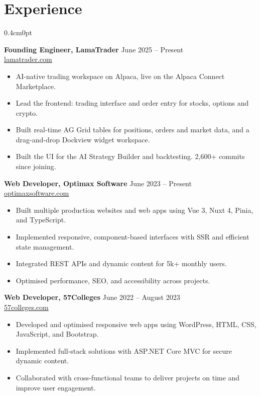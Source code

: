 \documentclass[a4paper,10pt]{article}
\newcommand{\Subtitle}[2][true]{%
    \vspace{0.3em}%
    {\fontsize{10.5}{12}\selectfont \textbf{#2}}%
    \ifstrequal{#1}{true}{\vspace{0.3em}}{}%
}
\begin{document}
\section*{Experience}
\begin{adjustwidth}{0.4cm}{0pt}

\Subtitle[false]{Founding Engineer, LamaTrader} \hfill June 2025 -- Present \\
\href{https://lamatrader.com}{lamatrader.com}
\begin{itemize}
    \item AI-native trading workspace on Alpaca, live on the Alpaca Connect Marketplace.
    \item Lead the frontend: trading interface and order entry for stocks, options and crypto.
    \item Built real-time AG Grid tables for positions, orders and market data, and a drag-and-drop Dockview widget workspace.
    \item Built the UI for the AI Strategy Builder and backtesting. 2,600+ commits since joining.
\end{itemize}

\Subtitle[false]{Web Developer, Optimax Software} \hfill June 2023 -- Present \\
\href{https://optimaxsoftware.com/}{optimaxsoftware.com}
\begin{itemize}
    \item Built multiple production websites and web apps using Vue 3, Nuxt 4, Pinia, and TypeScript.
    \item Implemented responsive, component-based interfaces with SSR and efficient state management.
    \item Integrated REST APIs and dynamic content for 5k+ monthly users.
    \item Optimised performance, SEO, and accessibility across projects.
\end{itemize}

\Subtitle[false]{Web Developer, 57Colleges} \hfill June 2022 -- August 2023 \\
\href{https://57colleges.com}{57colleges.com}
\begin{itemize}
    \item Developed and optimised responsive web apps using WordPress, HTML, CSS, JavaScript, and Bootstrap.
    \item Implemented full-stack solutions with ASP.NET Core MVC for secure dynamic content.
    \item Collaborated with cross-functional teams to deliver projects on time and improve user engagement.
\end{itemize}

\end{adjustwidth}
\end{document}
